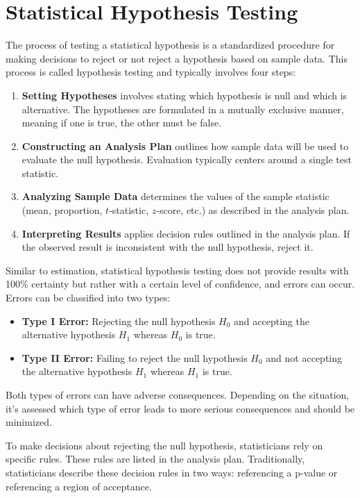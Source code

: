 \section{Statistical Hypothesis Testing}
The process of testing a statistical hypothesis is a standardized procedure for making decisions to reject or not reject a hypothesis based on sample data. This process is called hypothesis testing and typically involves four steps:

\begin{enumerate}
 \item \textbf{Setting Hypotheses} involves stating which hypothesis is null and which is alternative. The hypotheses are formulated in a mutually exclusive manner, meaning if one is true, the other must be false.
 \item \textbf{Constructing an Analysis Plan} outlines how sample data will be used to evaluate the null hypothesis. Evaluation typically centers around a single test statistic.
 \item \textbf{Analyzing Sample Data} determines the values of the sample statistic (mean, proportion, $t$-statistic, $z$-score, etc.) as described in the analysis plan.
 \item \textbf{Interpreting Results} applies decision rules outlined in the analysis plan. If the observed result is inconsistent with the null hypothesis, reject it.
\end{enumerate}

Similar to estimation, statistical hypothesis testing does not provide results with 100\% certainty but rather with a certain level of confidence, and errors can occur. Errors can be classified into two types:

\begin{itemize}
 \item \textbf{Type I Error:} Rejecting the null hypothesis $H_0$
       and accepting the alternative hypothesis $H_1$ whereas $H_0$ is true.
 \item \textbf{Type II Error:} Failing to reject the null hypothesis $H_0$ and not accepting the alternative hypothesis $H_1$ whereas $H_1$ is true.
\end{itemize}

Both types of errors can have adverse consequences. Depending on the situation, it's assessed which type of error leads to more serious consequences and should be minimized.

To make decisions about rejecting the null hypothesis, statisticians rely on specific rules. These rules are listed in the analysis plan. Traditionally, statisticians describe these decision rules in two ways: referencing a p-value or referencing a region of acceptance.

